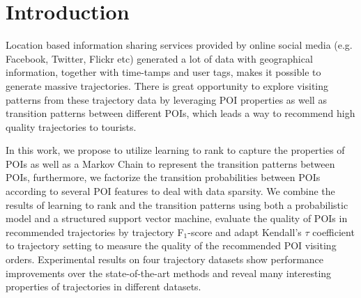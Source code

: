 \section{Introduction}
\label{sec:introduction}
Location based information sharing services provided by online social media 
(e.g. Facebook, Twitter, Flickr etc) generated a lot of data with geographical information, 
together with time-tamps and user tags, makes it possible to generate massive trajectories.
There is great opportunity to explore visiting patterns from these trajectory data by leveraging POI properties 
as well as transition patterns between different POIs, which leads a way to recommend high quality trajectories to tourists.

In this work, we propose to utilize learning to rank to capture the properties of POIs as well as a Markov Chain to 
represent the transition patterns between POIs, furthermore, we factorize the transition probabilities between POIs
according to several POI features to deal with data sparsity.
We combine the results of learning to rank and the transition patterns using both a probabilistic model and a structured
support vector machine, evaluate the quality of POIs in recommended trajectories by trajectory F$_1$-score\cite{ijcai15} and 
adapt Kendall's $\tau$ coefficient\cite{kendalltau} to trajectory setting to measure the quality of the recommended POI visiting orders.
Experimental results on four trajectory datasets show performance improvements over the state-of-the-art methods and 
reveal many interesting properties of trajectories in different datasets.
